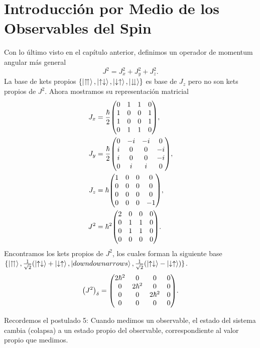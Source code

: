 \section{Introducción por Medio de los Observables del Spin}
Con lo último visto en el capítulo anterior, definimos un operador de momentum angular más general
	\begin{equation}
		J^2 = J_x ^2 + J_y ^2 + J_z ^2 .
	\end{equation}
La base de kets propios $\{ \ket{\upuparrows}, \ket{\uparrow \downarrow}, \ket{\downarrow \uparrow}, \ket{\downdownarrows} \}$ es base de $J_z$ pero no son kets propios de $J^2$. Ahora mostramos su representación matricial
\begin{align}
	J_x &= \frac{\hbar}{2} \mqty(0 & 1 & 1 & 0 \\
								 1 & 0 & 0 & 1 \\
								 1 & 0 & 0 & 1 \\
								 0 & 1 & 1 & 0), \\
	J_y &= \frac{\hbar}{2} \mqty(0 & -i & -i & 0 \\
								 i & 0 & 0 & -i \\
								 i & 0 & 0 & -i \\
								 0 & i & i & 0), \\
	J_z &= \hbar \mqty(1 & 0 & 0 & 0 \\
								 0 & 0 & 0 & 0 \\
								 0 & 0 & 0 & 0 \\
								 0 & 0 & 0 & -1), \\
	J^2 &= \hbar ^2 \mqty(2 & 0 & 0 & 0 \\
								 0 & 1 & 1 & 0 \\
								 0 & 1 & 1 & 0 \\
								 0 & 0 & 0 & 0).
\end{align}
Encontramos los kets propios de $J^2$, los cuales forman la siguiente base $\{ \ket{\upuparrows}, \frac{1}{\sqrt{2}} (\ket{\uparrow \downarrow} + \ket{\downarrow \uparrow}, \ket{downdownarrows}, \frac{1}{\sqrt{2}} (\ket{\uparrow \downarrow} - \ket{\downarrow \uparrow}) \}$.
\begin{equation}
	\qty(J^2)_\delta = \mqty(2\hbar ^2 & 0 & 0 & 0 \\
							 0 & 2\hbar ^2 & 0 & 0 \\
							 0 & 0 & 2\hbar ^2 & 0 \\
							 0 & 0 & 0 & 0).
\end{equation}


Recordemos el postulado 5: Cuando medimos un observable, el estado del sistema cambia (colapsa) a un estado propio del observable, correspondiente al valor propio que medimos.

